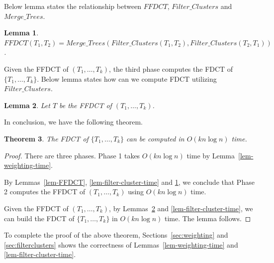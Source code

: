 \documentclass[final,1p,times]{elsarticle}
\newtheorem{theorem}{Theorem}
\newtheorem{lemma}[theorem]{Lemma}
\begin{document}
    Below lemma states the relationship between $FFDCT$, $Filter\_Clusters$ and $Merge\_Trees$.
    \begin{lemma}
	    \label{lem-FFDCT-merge-filter}
	    $FFDCT(T_1, T_2) = Merge\_Trees( Filter\_Clusters(T_1, T_2), Filter\_Clusters(T_2, T_1) )$.
    \end{lemma}


    Given the FFDCT of $(T_1, \ldots, T_k)$, the third phase computes the FDCT of $\{ T_1, \ldots, T_k \}$. Below lemma states how can we compute FDCT utilizing $Filter\_Clusters$.
    \begin{lemma}
	    \label{lem-FDCT}
	    Let $T$ be the FFDCT of $(T_1, \ldots, T_k)$. 

    \end{lemma}



    In conclusion, we have the following theorem.
    \begin{theorem}
    The FDCT of $\{T_1, \ldots, T_k\}$ can be computed in $O(kn \log n)$ time.
    \end{theorem}
    \begin{proof}
	    There are three phases.
	    Phase 1 takes $O(k n \log n)$ time by Lemma~\ref{lem-weighting-time}.

	    By Lemmas~\ref{lem-FFDCT}, \ref{lem-filter-cluster-time} and \ref{lem-FFDCT-merge-filter}, we conclude that Phase 2 computes the FFDCT of $(T_1, \ldots, T_k)$ using $O(k n \log n)$ time.


	    Given the FFDCT of $(T_1, \ldots, T_k)$, by Lemmas~\ref{lem-FDCT} and \ref{lem-filter-cluster-time}, we can build the FDCT of $\{T_1, \ldots, T_k\}$ in $O(kn \log n)$ time.
	    The lemma follows.
    \end{proof}

    To complete the proof of the above theorem, Sections~\ref{sec:weighting} and \ref{sec:filterclusters} shows the correctness of Lemmas~\ref{lem-weighting-time} and \ref{lem-filter-cluster-time}.

\end{document}
